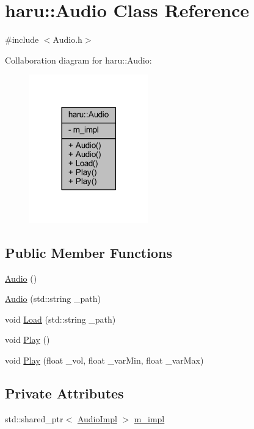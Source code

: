 \hypertarget{classharu_1_1_audio}{}\section{haru\+:\+:Audio Class Reference}
\label{classharu_1_1_audio}


{\ttfamily \#include $<$Audio.\+h$>$}



Collaboration diagram for haru\+:\+:Audio\+:\nopagebreak
\begin{figure}[H]
\begin{center}
\leavevmode
\includegraphics[width=146pt]{classharu_1_1_audio__coll__graph}
\end{center}
\end{figure}
\subsection*{Public Member Functions}
\begin{DoxyCompactItemize}
\item 
\mbox{\hyperlink{classharu_1_1_audio_aea8dbe76a9546e5caf2697d87e75d7db}{Audio}} ()
\item 
\mbox{\hyperlink{classharu_1_1_audio_ab1f431d428ad8f32a1fc3b0762ebb234}{Audio}} (std\+::string \+\_\+path)
\item 
void \mbox{\hyperlink{classharu_1_1_audio_a910757e64404e79e74f027189c56acd5}{Load}} (std\+::string \+\_\+path)
\item 
void \mbox{\hyperlink{classharu_1_1_audio_abedc73a31046f365320e7202d7c04b03}{Play}} ()
\item 
void \mbox{\hyperlink{classharu_1_1_audio_a0f9082d935880d64f4ee92493cfedf61}{Play}} (float \+\_\+vol, float \+\_\+var\+Min, float \+\_\+var\+Max)
\end{DoxyCompactItemize}
\subsection*{Private Attributes}
\begin{DoxyCompactItemize}
\item 
std\+::shared\+\_\+ptr$<$ \mbox{\hyperlink{structharu_1_1_audio_impl}{Audio\+Impl}} $>$ \mbox{\hyperlink{classharu_1_1_audio_a5118c3a3f1f33bcaee29dc619e3e68bd}{m\+\_\+impl}}
\end{DoxyCompactItemize}


